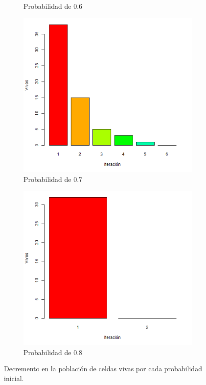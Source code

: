 \documentclass{article}
\begin{document}
\begin{figure}
\begin{subfigure}[b]{0.4\linewidth}
\caption{Probabilidad de 0.6}
\label{prob6}
\end{subfigure}
\begin{subfigure}[b]{0.4\linewidth}
\includegraphics[width=\linewidth]{prob0-7.png}
\caption{Probabilidad de 0.7}
\label{prob7}
\end{subfigure}
\begin{subfigure}[b]{0.4\linewidth}
\includegraphics[width=\linewidth]{prob0-8.png}
\caption{Probabilidad de 0.8}
\label{prob8}
\end{subfigure}
\caption{Decremento en la población de celdas vivas por cada probabilidad inicial.}
\label{decremento}
\end{figure}
\end{document}
